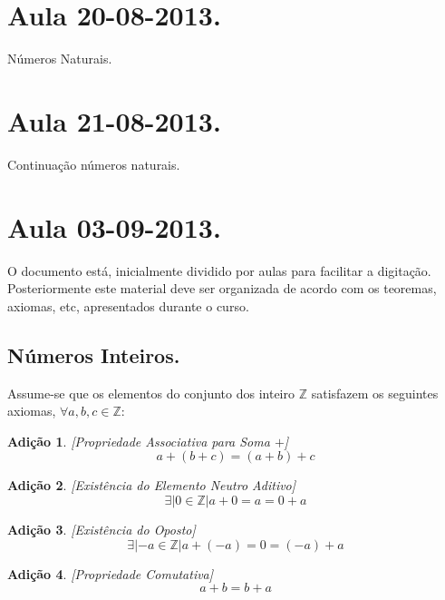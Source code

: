 \documentclass[a4paper,12pt]{article}
\newtheorem{add_int}{Adição}
\begin{document}
\section{Aula 20-08-2013.}

Números Naturais.

\section{Aula 21-08-2013.}

Continuação números naturais.

\section{Aula 03-09-2013.}

O documento está, inicialmente dividido por aulas para facilitar a digitação. Posteriormente este material deve ser organizada de acordo com os teoremas, axiomas, etc, apresentados durante o curso.

\subsection{Números Inteiros.}

Assume-se que os elementos do conjunto dos inteiro $\mathbb{Z}$ satisfazem os seguintes axiomas, $\forall a, b, c \in \mathbb{Z}$:

\begin{add_int}\label{A1}[Propriedade Associativa para Soma $+$]
  \begin{equation*}
    a + (b + c) = (a + b) + c
  \end{equation*}
\end{add_int}

\begin{add_int}\label{A2}[Existência do Elemento Neutro Aditivo]
  \begin{equation*}
    \exists |0 \in \mathbb{Z}| a + 0 = a = 0 + a
  \end{equation*}
\end{add_int}

\begin{add_int}\label{A3}[Existência do Oposto]
  \begin{equation*}
    \exists |-a \in \mathbb{Z}| a + (-a) = 0 = (-a) + a
  \end{equation*}
\end{add_int}

\begin{add_int}\label{A4}[Propriedade Comutativa]
  \begin{equation*}
    a + b = b + a
  \end{equation*}
\end{add_int}
\end{document}
